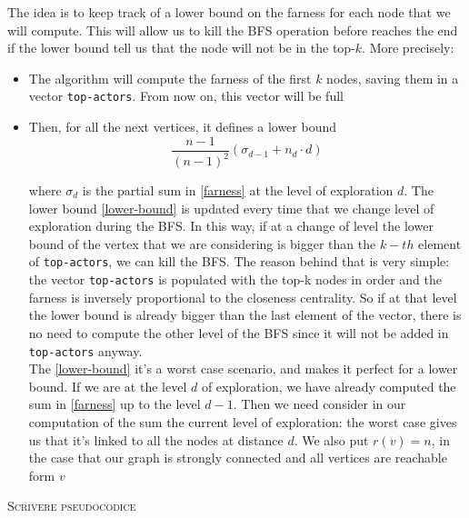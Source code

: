 \noindent The idea is to keep track of a lower bound on the farness for each node that we will compute. This will allow us to kill the BFS operation before reaches the end if the lower bound tell us that the node will not be in the top-$k$. More precisely:

\begin{itemize}
    \item The algorithm will compute the farness of the first $k$ nodes, saving them in a vector \texttt{top-actors}. From now on, this vector will be full

    \item Then, for all the next vertices, it defines a lower bound
    \begin{equation}\label{lower-bound}
        \frac{n-1}{(n-1)^2} (\sigma_{d-1} + n_d \cdot d)
    \end{equation}

    where $\sigma_d$ is the partial sum in \eqref{farness} at the level of exploration $d$. The lower bound \eqref{lower-bound} is updated every time that we change level of exploration during the BFS. In this way, if at a change of level the lower bound of the vertex that we are considering is bigger than the $k-th$ element of \texttt{top-actors}, we can kill the BFS. The reason behind that is very simple: the vector \texttt{top-actors} is populated with the top-k nodes in order and the farness is inversely proportional to the closeness centrality. So if at that level the lower bound is already bigger than the last element of the vector, there is no need to compute the other level of the BFS since it will not be added in \texttt{top-actors} anyway. \\

    The \eqref{lower-bound} it's a worst case scenario, and makes it perfect for a lower bound. If we are at the level $d$ of exploration, we have already computed the sum in \eqref{farness} up to the level $d-1$. Then we need consider in our computation of the sum the current level of exploration: the worst case gives us that it's linked to all the nodes at distance $d$. We also put $r(v)=n$, in the case that our graph is strongly connected and all vertices are reachable form $v$
\end{itemize}

\textsc{Scrivere pseudocodice}




